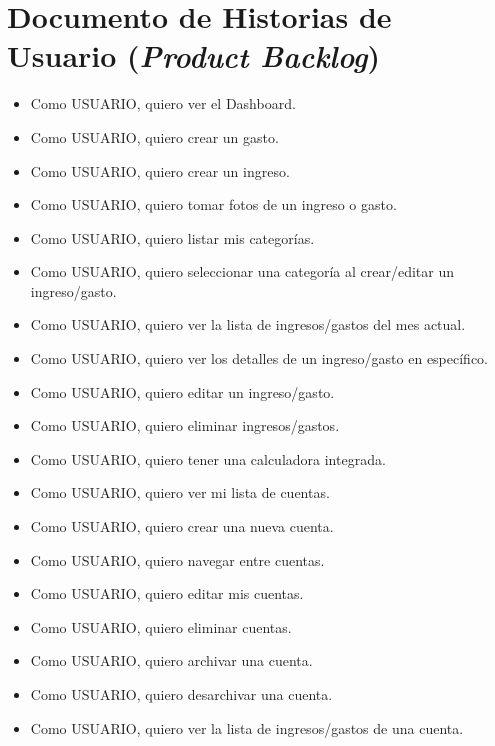 \chapter{Documento de Historias de Usuario (\textit{Product Backlog})}\label{chap:Product Backlog}

\begin{itemize}
	\item Como USUARIO, quiero ver el Dashboard. %
	\item Como USUARIO, quiero crear un gasto. %
	
	\item Como USUARIO, quiero crear un ingreso. %
	\item Como USUARIO, quiero tomar fotos de un ingreso o gasto. %
	\item Como USUARIO, quiero listar mis categorías. %
	\item Como USUARIO, quiero seleccionar una categoría al crear/editar un ingreso/gasto. %
	\item Como USUARIO, quiero ver la lista de ingresos/gastos del mes actual. %
	\item Como USUARIO, quiero ver los detalles de un ingreso/gasto en específico. %
	\item Como USUARIO, quiero editar un ingreso/gasto. %
	\item Como USUARIO, quiero eliminar ingresos/gastos. %
	\item Como USUARIO, quiero tener una calculadora integrada. %

	\item Como USUARIO, quiero ver mi lista de cuentas. %
	\item Como USUARIO, quiero crear una nueva cuenta. %
	\item Como USUARIO, quiero navegar entre cuentas. %
	\item Como USUARIO, quiero editar mis cuentas. %
	\item Como USUARIO, quiero eliminar cuentas. %
	\item Como USUARIO, quiero archivar una cuenta. %
	\item Como USUARIO, quiero desarchivar una cuenta. %
	\item Como USUARIO, quiero ver la lista de ingresos/gastos de una cuenta. %


\end{itemize}
